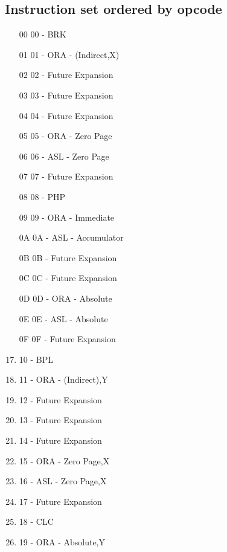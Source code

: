 \documentclass{article}
\begin{document}
\subsection{Instruction set ordered by opcode}
\setlength{\columnsep}{-1cm}
  \begin{multicols}{2}
  \begin{enumerate}[label=\enumHex*,start=0]
    \item[00] 00 - BRK                        
    \item[01] 01 - ORA - (Indirect,X)         
    \item[02] 02 - Future Expansion           
    \item[03] 03 - Future Expansion           
    \item[04] 04 - Future Expansion           
    \item[05] 05 - ORA - Zero Page            
    \item[06] 06 - ASL - Zero Page            
    \item[07] 07 - Future Expansion           
    \item[08] 08 - PHP                        
    \item[09] 09 - ORA - Immediate            
    \item[0A] 0A - ASL - Accumulator          
    \item[0B] 0B - Future Expansion           
    \item[0C] 0C - Future Expansion           
    \item[0D] 0D - ORA - Absolute             
    \item[0E] 0E - ASL - Absolute             
    \item[0F] 0F - Future Expansion 
    \setcounter{enumi}{15}          
    \item 10 - BPL                        
    \item 11 - ORA - (Indirect),Y         
    \item 12 - Future Expansion           
    \item 13 - Future Expansion           
    \item 14 - Future Expansion           
    \item 15 - ORA - Zero Page,X          
    \item 16 - ASL - Zero Page,X          
    \item 17 - Future Expansion           
    \item 18 - CLC                        
    \item 19 - ORA - Absolute,Y           

\end{enumerate}
\end{multicols}
\end{document}
